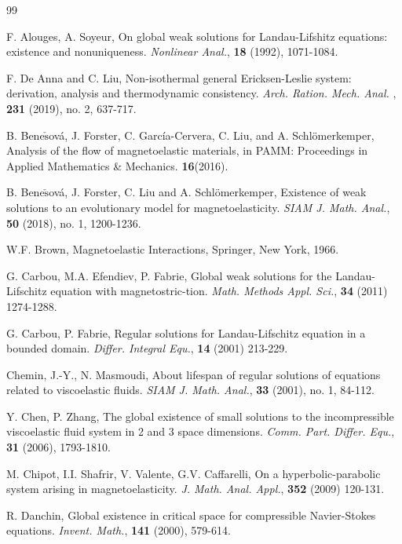 \documentclass[reqno,11pt]{amsart}
\numberwithin{equation}{section}
\begin{document}

\begin{thebibliography}{99}

 F. Alouges, A. Soyeur, On global weak solutions for Landau-Lifshitz equations: existence and nonuniqueness. {\em Nonlinear Anal.}, \textbf{18} (1992), 1071-1084.

 	F. De Anna and C. Liu, Non-isothermal general Ericksen-Leslie system: derivation, analysis and
	thermodynamic consistency. {\em Arch. Ration. Mech. Anal. }, {\bf 231} (2019), no. 2, 637-717.

B. Bene$\check{\textrm{s}}$ov\'a, J. Forster, C. Garc\'ia-Cervera, C. Liu, and A. Schlömerkemper, Analysis of the flow of magnetoelastic materials, in PAMM: Proceedings in Applied Mathematics \& Mechanics. {\bf 16}(2016).

	 B. Bene$\check{\textrm{s}}$ov\'a, J. Forster, C. Liu and A. Schl\"omerkemper, Existence of weak solutions to an evolutionary model for magnetoelasticity. {\em SIAM J. Math. Anal.}, {\bf 50} (2018), no. 1, 1200-1236.

	 W.F. Brown, Magnetoelastic Interactions, Springer, New York, 1966.

	 G. Carbou, M.A. Efendiev, P. Fabrie, Global weak solutions for the Landau-Lifschitz equation with magnetostric-tion. {\em Math. Methods Appl. Sci.}, \textbf{34} (2011) 1274-1288.

 G. Carbou, P. Fabrie, Regular solutions for Landau-Lifschitz equation in a bounded domain. {\em Differ. Integral Equ.}, \textbf{14} (2001) 213-229.

 Chemin, J.-Y., N. Masmoudi, About lifespan of regular solutions of equations related to viscoelastic fluids. \textit{SIAM J. Math. Anal.}, \textbf{33} (2001), no. 1, 84-112. 

 Y. Chen, P. Zhang, The global existence of small solutions to the incompressible viscoelastic fluid system in 2 and 3 space dimensions. \textit{Comm. Part. Differ. Equ.}, \textbf{31}  (2006), 1793-1810.


 M. Chipot, I.I. Shafrir, V. Valente, G.V. Caffarelli, On a hyperbolic-parabolic system arising in magnetoelasticity. {\em J. Math. Anal. Appl.}, \textbf{352} (2009) 120-131.

 R. Danchin, Global existence in critical space for compressible Navier-Stokes equations. \textit{Invent. Math.}, \textbf{141} (2000), 579-614. 


\end{thebibliography}
\end{document}

